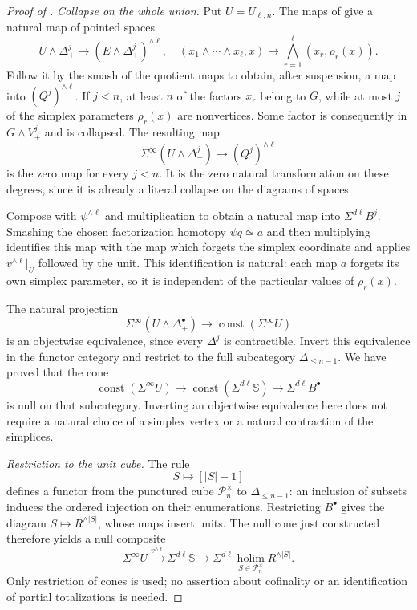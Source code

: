 \begin{proof}[Proof of ]
\smallskip
\noindent\emph{Collapse on the whole union.}
Put $U=U_{\ell,n}$.  The maps of  give a
natural map of pointed spaces
\[
U\wedge\Delta^j_+\longrightarrow(E\wedge\Delta^j_+)^{\wedge\ell},
\quad
(x_1\wedge\cdots\wedge x_\ell,x)
\longmapsto
\bigwedge_{r=1}^\ell(x_r,\rho_r(x)).
\]
Follow it by the smash of the quotient maps to obtain, after
suspension, a map into $(Q^j)^{\wedge\ell}$.  If $j<n$, at least $n$
of the factors $x_r$ belong to $G$, while at most $j$ of the simplex
parameters $\rho_r(x)$ are nonvertices.  Some factor is consequently
in $G\wedge V^j_+$ and is collapsed.  The resulting map
\begin{equation}
\label{eq:sliced-union-collapse}
\Sigma^\infty(U\wedge\Delta^j_+)
 \longrightarrow(Q^j)^{\wedge\ell}
\end{equation}
is the zero map for every $j<n$.  It is the zero natural
transformation on these degrees, since it is already a literal
collapse on the diagrams of spaces.

Compose  with $\psi^{\wedge\ell}$
and multiplication to obtain a natural map into
$\Sigma^{d\ell}B^j$.  Smashing the chosen factorization homotopy
$\psi q\simeq a$ and then multiplying identifies this map with the
map which forgets the simplex coordinate and applies
$v^{\wedge\ell}|_U$ followed by the unit.  This identification is
natural: each map $a$ forgets its own simplex parameter, so it is
independent of the particular values of $\rho_r(x)$.

The natural projection
\[
\Sigma^\infty(U\wedge\Delta^\bullet_+)
 \longrightarrow\operatorname{const}(\Sigma^\infty U)
\]
is an objectwise equivalence, since every $\Delta^j$ is contractible.
Invert this equivalence in the functor category and restrict to the
full subcategory $\Delta_{\leq n-1}$.  We have proved that the cone
\[
\operatorname{const}(\Sigma^\infty U)
 \longrightarrow\operatorname{const}(\Sigma^{d\ell}\mathbb S)
 \longrightarrow\Sigma^{d\ell}B^\bullet
\]
is null on that subcategory.  Inverting an objectwise equivalence here
does not require a natural choice of a simplex vertex or a natural
contraction of the simplices.

\smallskip
\noindent\emph{Restriction to the unit cube.}
The rule
\[
S\longmapsto[|S|-1]
\]
defines a functor from the punctured cube
$\mathcal P_n^\times$ to $\Delta_{\leq n-1}$:
an inclusion of subsets induces the ordered injection on their
enumerations.  Restricting $B^\bullet$ gives the diagram
$S\mapsto R^{\wedge|S|}$, whose maps insert units.  The null cone
just constructed therefore yields a null composite
\begin{equation}
\label{eq:unit-cube-null-cone}
\Sigma^\infty U\xrightarrow{v^{\wedge\ell}}
\Sigma^{d\ell}\mathbb S
\longrightarrow
\Sigma^{d\ell}\operatorname*{holim}_{S\in\mathcal P_n^\times}
 R^{\wedge|S|}.
\end{equation}
Only restriction of cones is used; no assertion about cofinality or
an identification of partial totalizations is needed.


\end{proof}
